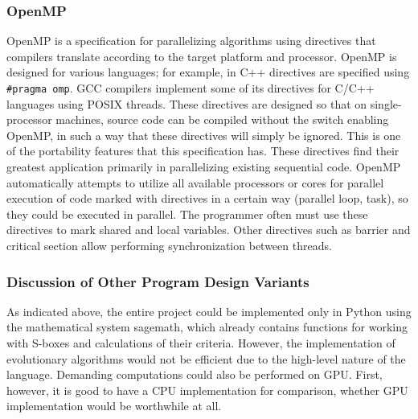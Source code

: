 \subsubsection{OpenMP}
OpenMP is a specification for parallelizing algorithms using directives that
compilers translate according to the target platform and processor.
OpenMP is designed for various languages; for example, in C++ directives are specified using
\verb|#pragma omp|.
GCC compilers implement
some of its directives for C/C++ languages using POSIX threads. These directives are designed so that on single-processor
machines, source code can be compiled without the switch enabling OpenMP, in such a way that
these directives will simply be ignored. This is one of the portability features
that this specification has. These directives find their greatest application primarily
in parallelizing existing sequential code. OpenMP automatically attempts to
utilize all available processors or cores for parallel execution of code marked
with directives in a certain way (parallel loop, task), so they could be executed in parallel.
The programmer often must use these directives to mark
shared and local variables. Other directives such as barrier and critical section allow
performing synchronization between threads.

\subsubsection{Discussion of Other Program Design Variants}
As indicated above, the entire project could be implemented only in Python using the mathematical system
sagemath, which already contains functions for working with S-boxes and calculations of their criteria.
However, the implementation of evolutionary algorithms would not be efficient due to the high-level nature of the language.
Demanding computations could also be performed on GPU.
First, however, it is good to have a CPU implementation for comparison, whether GPU implementation would be worthwhile at all.
